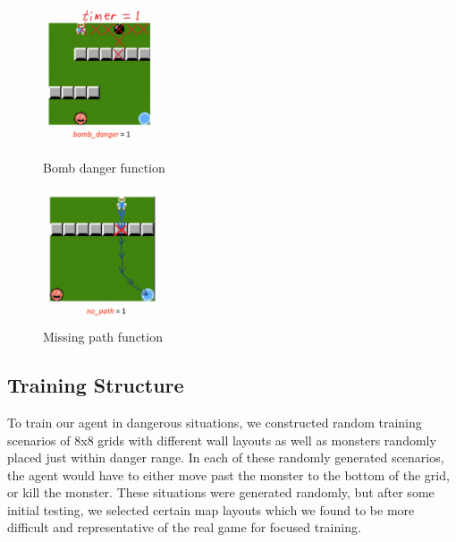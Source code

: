 \documentclass{article}
\begin{document}
\begin{figure}[!htb]
   \begin{minipage}{0.48\textwidth}
     \centering
     \includegraphics[height=4cm]{Writeup/bomb_danger_fn.jpg}
     \caption*{Bomb danger function}
   \end{minipage}\hfill
   \begin{minipage}{0.48\textwidth}
     \centering
     \includegraphics[height=4cm]{Writeup/no_path_fn.jpg}
     \caption*{Missing path function}
   \end{minipage}
\end{figure}


\subsection*{Training Structure}
To train our agent in dangerous situations, we constructed random training scenarios of 8x8 grids with different wall layouts as well as monsters randomly placed just within danger range. In each of these randomly generated scenarios, the agent would have to either move past the monster to the bottom of the grid, or kill the monster.
These situations were generated randomly, but after some initial testing, we selected certain map layouts which we found to be more difficult and representative of the real game for focused training.
\end{document}
